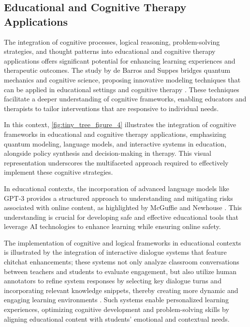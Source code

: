 









\subsection{Educational and Cognitive Therapy Applications} \label{subsec:Educational and Cognitive Therapy Applications}

The integration of cognitive processes, logical reasoning, problem-solving strategies, and thought patterns into educational and cognitive therapy applications offers significant potential for enhancing learning experiences and therapeutic outcomes. The study by de Barros and Suppes bridges quantum mechanics and cognitive science, proposing innovative modeling techniques that can be applied in educational settings and cognitive therapy \cite{debarros2015examplescontextualityphysicsimplications}. These techniques facilitate a deeper understanding of cognitive frameworks, enabling educators and therapists to tailor interventions that are responsive to individual needs.

In this context, \autoref{fig:tiny_tree_figure_4} illustrates the integration of cognitive frameworks in educational and cognitive therapy applications, emphasizing quantum modeling, language models, and interactive systems in education, alongside policy synthesis and decision-making in therapy. This visual representation underscores the multifaceted approach required to effectively implement these cognitive strategies.

In educational contexts, the incorporation of advanced language models like GPT-3 provides a structured approach to understanding and mitigating risks associated with online content, as highlighted by McGuffie and Newhouse \cite{mcguffie2020radicalizationrisksgpt3advanced}. This understanding is crucial for developing safe and effective educational tools that leverage AI technologies to enhance learning while ensuring online safety.

The implementation of cognitive and logical frameworks in educational contexts is illustrated by the integration of interactive dialogue systems that feature chitchat enhancements; these systems not only analyze classroom conversations between teachers and students to evaluate engagement, but also utilize human annotators to refine system responses by selecting key dialogue turns and incorporating relevant knowledge snippets, thereby creating more dynamic and engaging learning environments \cite{stricker2024enhancingtaskorienteddialogueschitchat}. Such systems enable personalized learning experiences, optimizing cognitive development and problem-solving skills by aligning educational content with students' emotional and contextual needs.

